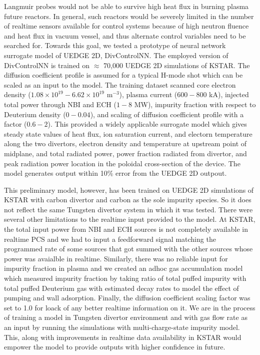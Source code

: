 Langmuir probes would not be able to survive high heat flux in burning plasma future reactors. In general, such reactors would be severely limited in the number of realtime sensors available for control systems because of high neutron fluence and heat flux in vacuum vessel, and thus alternate control variables need to be searched for. Towards this goal, we tested a prototype of neural network surrogate model of UEDGE 2D, DivControlNN. The employed version of DivControlNN is trained on $\approx$ 70,000 UEDGE 2D simulations of KSTAR. The diffusion coefficient profile is assumed for a typical H-mode shot which can be scaled as an input to the model. The training dataset scanned core electron density ($1.08 \times 10^{19} - 6.62 \times 10^{19}$ m$^{-3}$), plasma current ($600-800$ kA), injected total power through NBI and ECH ($1-8$ MW), impurity fraction with respect to Deuterium density ($0-0.04$), and scaling of diffusion coefficient profile with a factor ($0.6 - 2$). This provided a widely applicable surrogate model which gives steady state values of heat flux, ion saturation current, and electorn temperature along the two divertors, electron density and temperature at upstream point of midplane, and total radiated power, power fraction radiated from divertor, and peak radiation power location in the poloidal cross-section of the device. The model generates output within 10\% error from the UEDGE 2D outpout.

This preliminary model, however, has been trained on UEDGE 2D simulations of KSTAR with carbon divertor and carbon as the sole impurity species. So it does not reflect the same Tungsten divertor system in which it was tested. There were several other limitations to the realtime input provided to the model. At KSTAR, the total input power from NBI and ECH sources is not completely available in realtime PCS and we had to input a feedforward signal matching the programmed rate of some sources that got summed with the other sources whose power was avaialble in realtime. Similarly, there was no reliable input for impurity fraction in plasma and we created an adhoc gas accumulation model which measured impurity fraction by taking ratio of total puffed impurity with total puffed Deuterium gas with estimated decay rates to model the effect of pumping and wall adsorption. Finally, the diffusion coefficient scaling factor was set to 1.0 for loack of any better realtime information on it. We are in the process of training a model in Tungsten divertor environment and with gas flow rate as an input by running the simulations with multi-charge-state impurity model. This, along with improvements in realtime data availability in KSTAR would empower the model to provide outputs with higher confidence in future.
